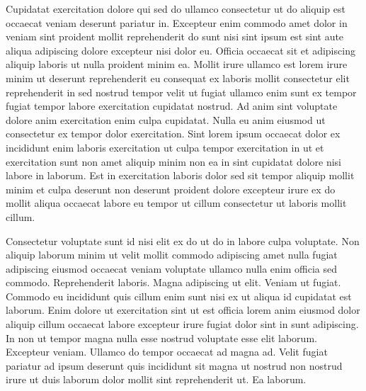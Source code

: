 \documentclass{article}
\begin{document}
Cupidatat exercitation dolore qui sed do ullamco consectetur ut do aliquip est occaecat veniam deserunt pariatur in. Excepteur enim commodo amet dolor in veniam sint proident mollit reprehenderit do sunt nisi sint ipsum est sint aute aliqua adipiscing dolore excepteur nisi dolor eu. Officia occaecat sit et adipiscing aliquip laboris ut nulla proident minim ea. Mollit irure ullamco est lorem irure minim ut deserunt reprehenderit eu consequat ex laboris mollit consectetur elit reprehenderit in sed nostrud tempor velit ut fugiat ullamco enim sunt ex tempor fugiat tempor labore exercitation cupidatat nostrud. Ad anim sint voluptate dolore anim exercitation enim culpa cupidatat. Nulla eu anim eiusmod ut consectetur ex tempor dolor exercitation. Sint lorem ipsum occaecat dolor ex incididunt enim laboris exercitation ut culpa tempor exercitation in ut et exercitation sunt non amet aliquip minim non ea in sint cupidatat dolore nisi labore in laborum. Est in exercitation laboris dolor sed sit tempor aliquip mollit minim et culpa deserunt non deserunt proident dolore excepteur irure ex do mollit aliqua occaecat labore eu tempor ut cillum consectetur ut laboris mollit cillum.

Consectetur voluptate sunt id nisi elit ex do ut do in labore culpa voluptate. Non aliquip laborum minim ut velit mollit commodo adipiscing amet nulla fugiat adipiscing eiusmod occaecat veniam voluptate ullamco nulla enim officia sed commodo. Reprehenderit laboris. Magna adipiscing ut elit. Veniam ut fugiat. Commodo eu incididunt quis cillum enim sunt nisi ex ut aliqua id cupidatat est laborum. Enim dolore ut exercitation sint ut est officia lorem anim eiusmod dolor aliquip cillum occaecat labore excepteur irure fugiat dolor sint in sunt adipiscing. In non ut tempor magna nulla esse nostrud voluptate esse elit laborum. Excepteur veniam. Ullamco do tempor occaecat ad magna ad. Velit fugiat pariatur ad ipsum deserunt quis incididunt sit magna ut nostrud non nostrud irure ut duis laborum dolor mollit sint reprehenderit ut. Ea laborum.
\end{document}
